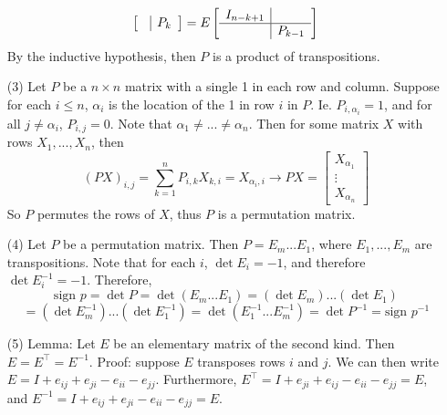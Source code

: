 \documentclass[12pt]{article}
\begin{document}
\begin{itemize}
$$\begin{bmatrix}
\begin{array}{c|c}
& P_k
\end{array}
\end{bmatrix} = E
\begin{bmatrix}
\begin{array}{c|c}
I_{n-k+1} \\
\hline
& P_{k-1}
\end{array}
\end{bmatrix}$$
By the inductive hypothesis, then $P$ is a product of transpositions.
\item[(3)]
Let $P$ be a $n \times n$ matrix with a single 1 in each row and column. Suppose for each $i \leq n$, $\alpha_i$ is the location of the 1 in row $i$ in $P$. Ie. $P_{i, \alpha_i} = 1$, and for all $j \neq \alpha_i$, $P_{i, j} = 0$. Note that $\alpha_1 \neq ... \neq \alpha_n$. Then for some matrix $X$ with rows $X_1, ..., X_n$, then
$$(PX)_{i,j} = \sum_{k=1}^n P_{i,k}X_{k,i} = X_{\alpha_i, i} \rightarrow PX = \begin{bmatrix}
X_{\alpha_1} \\
\vdots \\
X_{\alpha_n}
\end{bmatrix}$$
So $P$ permutes the rows of $X$, thus $P$ is a permutation matrix.
\item[(4)]
Let $P$ be a permutation matrix. Then $P = E_m...E_1$, where $E_1, ..., E_m$ are transpositions. Note that for each $i$, $\det E_i = -1$, and therefore $\det E_i^{-1} = -1$. Therefore,
$$\text{sign }p = \det P = \det (E_m...E_1) = (\det E_m)...(\det E_1)$$
$$= (\det E_m^{-1})...(\det E_1^{-1}) = \det(E_1^{-1}...E_m^{-1}) = \det P^{-1} = \text{sign }p^{-1}$$
\item[(5)]
Lemma: Let $E$ be an elementary matrix of the second kind. Then $E = E^\top = E^{-1}$. Proof: suppose $E$ transposes rows $i$ and $j$. We can then write $E = I + e_{ij} + e_{ji} - e_{ii} - e_{jj}$. Furthermore, $E^\top = I + e_{ji} + e_{ij} - e_{ii} - e_{jj} = E$, and $E^{-1} = I + e_{ij} + e_{ji} - e_{ii} - e_{jj} = E$.


\end{itemize}
\end{document}
